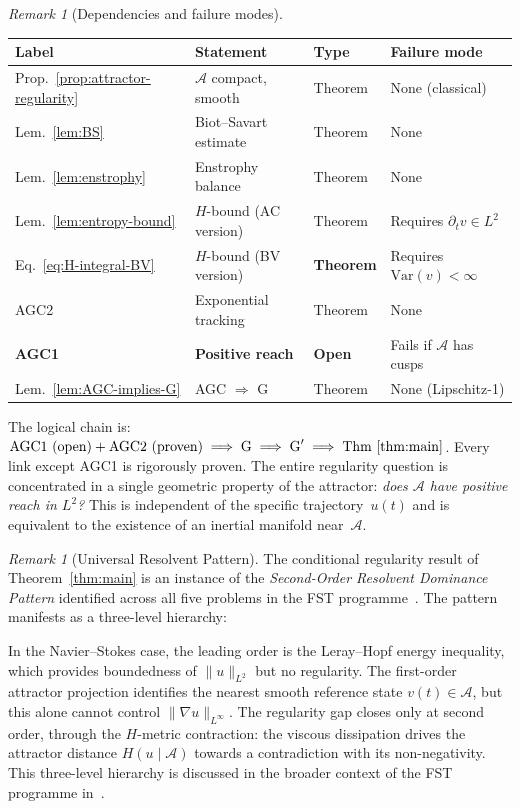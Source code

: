 \documentclass[12pt,a4paper]{article}
\theoremstyle{definition}
\theoremstyle{plain}
\theoremstyle{remark}
\newtheorem{remark}[definition]{Remark}
\begin{document}
\begin{remark}[Dependencies and failure modes]\label{rem:dependencies}
\mbox{}

\begin{center}
\begin{tabular}{llll}
\hline
\textbf{Label} & \textbf{Statement} & \textbf{Type} & \textbf{Failure mode} \\
\hline
Prop.~\ref{prop:attractor-regularity} &
  $\mathcal{A}$ compact, smooth &
  Theorem & None (classical) \\
Lem.~\ref{lem:BS} &
  Biot--Savart estimate &
  Theorem & None \\
Lem.~\ref{lem:enstrophy} &
  Enstrophy balance &
  Theorem & None \\
Lem.~\ref{lem:entropy-bound} &
  $H$-bound (AC version) &
  Theorem & Requires $\partial_t v \in L^2$ \\
Eq.~\eqref{eq:H-integral-BV} &
  $H$-bound (BV version) &
  \textbf{Theorem} & Requires $\mathrm{Var}(v) < \infty$ \\
AGC2 &
  Exponential tracking &
  Theorem & None~\cite{Temam2001} \\
\textbf{AGC1} &
  \textbf{Positive reach} &
  \textbf{Open} &
  Fails if $\mathcal{A}$ has cusps \\
Lem.~\ref{lem:AGC-implies-G} &
  AGC $\Rightarrow$ G &
  Theorem & None (Lipschitz-1) \\
\hline
\end{tabular}
\end{center}

\medskip\noindent
The logical chain is:
$\textup{AGC1 (open)} + \textup{AGC2 (proven)}
\;\Longrightarrow\;
\textup{G}
\;\Longrightarrow\;
\textup{G}'
\;\Longrightarrow\;
\textup{Thm~\ref{thm:main}}$.
Every link except AGC1 is rigorously proven. The entire regularity
question is concentrated in a single geometric property of the
attractor: \emph{does $\mathcal{A}$ have positive reach in $L^2$?}
This is independent of the specific trajectory~$u(t)$ and is
equivalent to the existence of an inertial manifold near~$\mathcal{A}$.
\end{remark}

\begin{remark}[Universal Resolvent Pattern]\label{rem:universal-resolvent}
The conditional regularity result of Theorem~\ref{thm:main} is an instance of the
\emph{Second-Order Resolvent Dominance Pattern} identified across all five
problems in the FST programme~\cite{FST-Unified2026}. The pattern manifests as
a three-level hierarchy:

\noindent
In the Navier--Stokes case, the leading order is the Leray--Hopf energy
inequality, which provides boundedness of $\|u\|_{L^2}$ but no regularity.
The first-order attractor projection identifies the nearest smooth
reference state $v(t) \in \mathcal{A}$, but this alone cannot control
$\|\nabla u\|_{L^\infty}$.  The regularity gap closes only at second
order, through the $H$-metric contraction: the viscous dissipation
drives the attractor distance $H(u \mid \mathcal{A})$ towards a
contradiction with its non-negativity.  This three-level hierarchy is
discussed in the broader context of the FST programme
in~\cite{FST-Unified2026}.
\end{remark}
\end{document}
